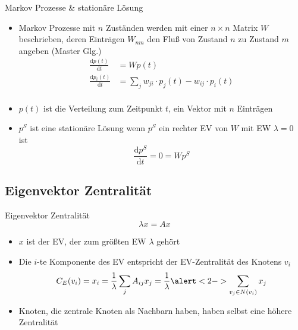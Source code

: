 \documentclass[]{beamer}
\begin{document}
\begin{frame}{Markov Prozesse \& stationäre Lösung}
	\begin{itemize}[<+-| alert@+>]
		\item Markov Prozesse mit $n$ Zuständen werden mit einer  $n\times n$ Matrix $W$ beschrieben, deren Einträgen $W_{nm}$ den Fluß von Zustand $n$ zu Zustand $m$ angeben (Master Glg.)
		\begin{align*}
			\frac{\mathrm d{p(t)}}{\mathrm d{t}} &= Wp(t)\\
			\frac{\mathrm d{p_i(t)}}{\mathrm d{t}} &= \sum_j w_{ji} \cdot p_j(t)  - w_{ij}\cdot p_i(t)\\
		\end{align*}
		\item $p(t)$ ist die Verteilung zum Zeitpunkt $t$, ein Vektor mit $n$ Einträgen
		\item $p^S$ ist eine stationäre Lösung wenn $p^S$ ein rechter  EV von $W$ mit EW $\lambda =0$ ist
		\begin{equation*}
			\frac{\mathrm d p^S}{\mathrm d t} = 0 = Wp^S
		\end{equation*}
	\end{itemize}	
\end{frame}



\subsection{Eigenvektor Zentralität}

\begin{frame}{Eigenvektor Zentralität}
	\begin{equation*}\lambda x = Ax\label{eq:evEq}\end{equation*}
	\begin{itemize}
		\item $x$ ist der EV, der zum größten EW $\lambda$ gehört
		\item Die  $i$-te Komponente des EV entspricht der EV-Zentralität des Knotens $v_i$
		\begin{equation*}
			C_E(v_i) = 	x_i = \frac1{\lambda}\sum_jA_{ij}x_j = \frac1\lambda\alert<2->{\sum_{v_j\in N(v_i)} x_j}
		\end{equation*}
		\item<2-| alert@+> Knoten, die zentrale Knoten als Nachbarn haben, haben selbst eine höhere Zentralität
	\end{itemize}
\end{frame}
\end{document}
